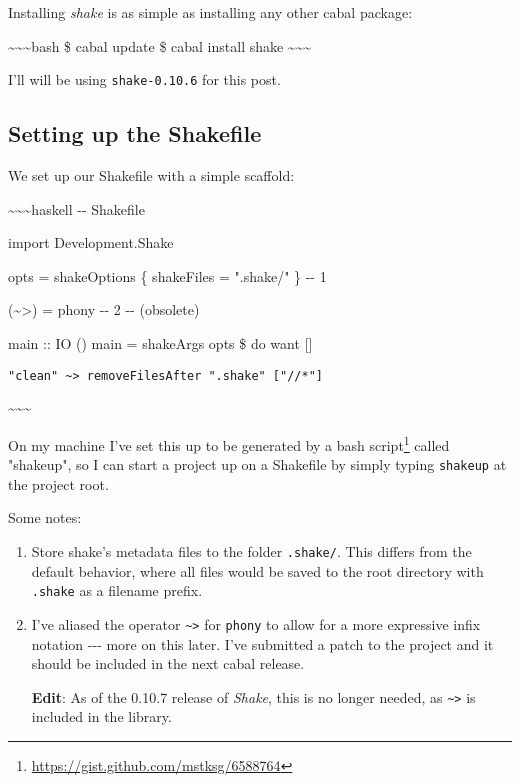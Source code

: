 \documentclass[]{article}
\renewcommand{\href}[2]{#2\footnote{\url{#1}}}
\begin{document}
Installing \emph{shake} is as simple as installing any other cabal package:

\textasciitilde{}\textasciitilde{}\textasciitilde{}bash \$ cabal update \$ cabal
install shake \textasciitilde{}\textasciitilde{}\textasciitilde{}

I'll will be using \texttt{shake-0.10.6} for this post.

\subsection{Setting up the Shakefile}

We set up our Shakefile with a simple scaffold:

\textasciitilde{}\textasciitilde{}\textasciitilde{}haskell -\/- Shakefile

import Development.Shake

opts = shakeOptions \{ shakeFiles = ".shake/" \} -\/- 1

(\textasciitilde{}\textgreater{}) = phony -\/- 2 -\/- (obsolete)

main :: IO () main = shakeArgs opts \$ do want {[}{]}

\begin{verbatim}
"clean" ~> removeFilesAfter ".shake" ["//*"]
\end{verbatim}

\textasciitilde{}\textasciitilde{}\textasciitilde{}

On my machine I've set this up to be generated by a
\href{https://gist.github.com/mstksg/6588764}{bash script} called "shakeup", so
I can start a project up on a Shakefile by simply typing \texttt{shakeup} at the
project root.

Some notes:

\begin{enumerate}
\item
  Store shake's metadata files to the folder \texttt{.shake/}. This differs from
  the default behavior, where all files would be saved to the root directory
  with \texttt{.shake} as a filename prefix.
\item
  I've aliased the operator \texttt{\textasciitilde{}\textgreater{}} for
  \texttt{phony} to allow for a more expressive infix notation -\/-\/- more on
  this later. I've submitted a patch to the project and it should be included in
  the next cabal release.

  \textbf{Edit}: As of the 0.10.7 release of \emph{Shake}, this is no longer
  needed, as \texttt{\textasciitilde{}\textgreater{}} is included in the
  library.
\end{enumerate}
\end{document}
